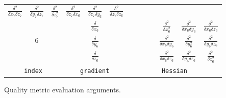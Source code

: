\documentclass{article}
\begin{document}
\begin{figure}[htb]
\begin{center}
\begin{tabular}{c|c|cc|c|cc|ccc|ccc|}
$\frac{\delta^2}{\delta x_7 \delta z_7}$ & 
$\frac{\delta^2}{\delta y_7 \delta z_7}$ & 
$\frac{\delta^2}{\delta z_7^2}         $ & 

$\frac{\delta^2}{\delta z_7 \delta x_6}$ & 
$\frac{\delta^2}{\delta z_7 \delta y_6}$ & 
$\frac{\delta^2}{\delta z_7 \delta z_6}$ \\

\cline{2-2}
\cline{5-5}
\cline{8-13}

\hspace{0.2cm} & & \hspace{0.2cm} & \hspace{0.2cm} &

$\frac{\delta}{\delta x_6}$ & \hspace{0.2cm} & \hspace{0.2cm} &

& & & 

$\frac{\delta^2}{\delta x_6^2}         $ & 
$\frac{\delta^2}{\delta x_6 \delta y_6}$ & 
$\frac{\delta^2}{\delta x_6 \delta z_6}$ \\ 


\hspace{0.2cm} & $6$ & \hspace{0.2cm} & \hspace{0.2cm} &

$\frac{\delta}{\delta y_6}$ & \hspace{0.2cm} & \hspace{0.2cm} &

& & &

$\frac{\delta^2}{\delta x_6 \delta y_6}$ & 
$\frac{\delta^2}{\delta y_6^2}         $ & 
$\frac{\delta^2}{\delta y_6 \delta z_6}$ \\

\hspace{0.2cm} & & \hspace{0.2cm} & \hspace{0.2cm} &

$\frac{\delta}{\delta z_6}$ & \hspace{0.2cm} & \hspace{0.2cm} &

& & &

$\frac{\delta^2}{\delta x_6 \delta z_6}$ & 
$\frac{\delta^2}{\delta y_6 \delta z_6}$ & 
$\frac{\delta^2}{\delta z_6^2}         $  \\

\cline{2-2}
\cline{5-5}
\cline{8-13}

\multicolumn{3}{c}{\texttt{index}} &  \multicolumn{3}{c}{\texttt{gradient}} &  \multicolumn{7}{c}{\texttt{Hessian}} \\

\end{tabular}
\end{center}

\caption{Quality metric evaluation arguments.\label{fig:evalargs}}
\end{figure}
\end{document}
